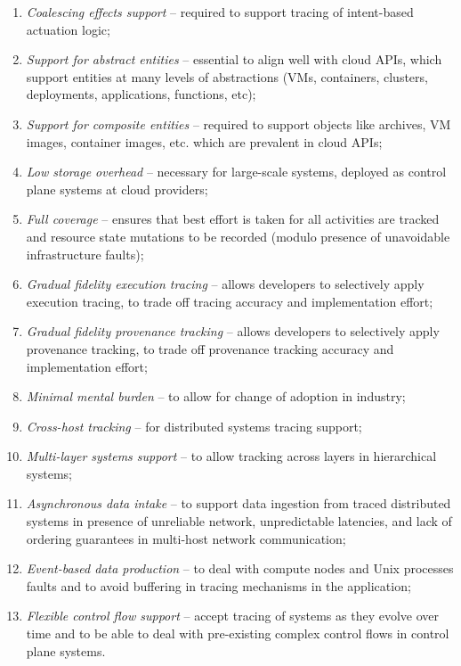 \begin{enumerate}
    \item \textit{Coalescing effects support} -- required to support tracing of intent-based actuation logic;
    \item \textit{Support for abstract entities} -- essential to align well with cloud APIs, which support entities at many levels of abstractions (VMs, containers, clusters, deployments, applications, functions, etc);
    \item \textit{Support for composite entities} -- required to support objects like archives, VM images, container images, etc. which are prevalent in cloud APIs;
    \item \textit{Low storage overhead} -- necessary for large-scale systems, deployed as control plane systems at cloud providers;
    \item \textit{Full coverage} -- ensures that best effort is taken for all activities are tracked and resource state mutations to be recorded (modulo presence of unavoidable infrastructure faults);
    \item \textit{Gradual fidelity execution tracing} -- allows developers to selectively apply execution tracing, to trade off tracing accuracy and implementation effort;
    \item \textit{Gradual fidelity provenance tracking} -- allows developers to selectively apply provenance tracking, to trade off provenance tracking accuracy and implementation effort;
    \item \textit{Minimal mental burden} -- to allow for change of adoption in industry;
    \item \textit{Cross-host tracking} -- for distributed systems tracing support;
    \item \textit{Multi-layer systems support} -- to allow tracking across layers in hierarchical systems;
    \item \textit{Asynchronous data intake} -- to support data ingestion from traced distributed systems in presence of unreliable network, unpredictable latencies, and lack of ordering guarantees in multi-host network communication;
    \item \textit{Event-based data production} -- to deal with compute nodes and Unix processes faults and to avoid buffering in tracing mechanisms in the application;
    \item \textit{Flexible control flow support} -- accept tracing of systems as they evolve  over time and to be able to deal with pre-existing complex control flows in control plane systems.
\end{enumerate}

